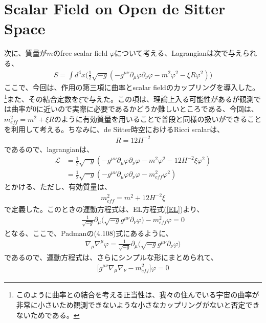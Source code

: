 \section{Scalar Field on Open de Sitter Space}
次に、質量が$m$のfree scalar field $\varphi$について考える、Lagrangianは次で与えられる、
\begin{align}
S=\int d^4x\biggr(\frac{1}{2}\sqrt{-g}(-g^{\mu\nu}\partial_{\mu}\varphi\partial_{\nu}\varphi-m^2\varphi^2-\xi R \varphi^2)\biggl)
\end{align}
ここで、今回は、作用の第三項に曲率とscalar fieldのカップリングを導入した。\footnote{このように曲率との結合を考える正当性は、我々の住んでいる宇宙の曲率が非常に小さいため観測できないような小さなカップリングがないと否定できないためである。}また、その結合定数を$\xi$で与えた。この項は、理論上入る可能性があるが観測では曲率が0に近いので実際に必要であるかどうか難しいところである、今回は、$m_{eff}^2=m^2+\xi R$のように有効質量を用いることで普段と同様の扱いができることを利用して考える。ちなみに、de Sitter時空におけるRicci scalarは、
\begin{align}
  R=12H^{-2}
\end{align}
であるので、lagrangianは、
\begin{align}
  \label{1.60}
  \mathcal{L}&=\frac{1}{2}\sqrt{-g}(-g^{\mu\nu}\partial_{\mu}\varphi\partial_{\nu}\varphi-m^2\varphi^2-12H^{-2}\xi \varphi^2) \\
  \label{1.61}
  &=\frac{1}{2}\sqrt{-g}(-g^{\mu\nu}\partial_{\mu}\varphi\partial_{\nu}\varphi-m_{eff}^2\varphi^2)
\end{align}
とかける、ただし、有効質量は、
\begin{align}
  m_{eff}^2=m^2+12H^{-2}\xi
\end{align}
で定義した。このときの運動方程式は、EL方程式(\ref{EL})より、
\begin{align}
    \frac{1}{\sqrt{-g}}\partial_{\mu}\biggl(\sqrt{-g}g^{\mu\nu}\partial_{\nu}\varphi
\biggr)
    -m_{eff}^2\varphi=0
\end{align}
となる、ここで、Padmanの(4.108)式にあるように、
\begin{align}
  \label{1.65}
  \nabla_{\mu}\nabla^{\mu}\varphi=\frac{1}{\sqrt{-g}}\partial_{\mu}\biggl(\sqrt{-g}g^{\mu\nu}\partial_{\nu}\varphi\biggr)
\end{align}
であるので、運動方程式は、さらにシンプルな形にまとめられて、
\begin{align}
  \label{1.66}
  \biggl[g^{\mu\nu}\nabla_{\mu}\nabla_{\nu}-m_{eff}^2\biggr]\varphi=0
\end{align}
